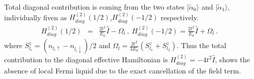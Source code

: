\documentclass[reprint,prb,superscriptaddress]{revtex4-1}
\begin{document}
Total diagonal contribution is coming from the two states $|\tilde{\alpha}_0\rangle$ and $|\tilde{\alpha}_1\rangle$, individually fiven as $H^{(2)}_{diag} (1/2)$,$H^{(2)}_{diag} (-1/2)$ respectively.
\begin{eqnarray}
H^{(2)}_{diag} (1/2) &=& \frac{2t^2}{E_0} \hat{I} - \Omega_l~,~ H^{(2)}_{diag} (-1/2) = \frac{2t^2}{E_0} \hat{I} + \Omega_l ~.~~~~
\end{eqnarray}
where $S_{l_i}^z=(n_{l_i\uparrow}-n_{l_i\downarrow})/2$ and $\Omega_l=\frac{2t^2}{3E_0} ( S_{l_1}^z + S_{l_2}^z)$.  Thus the total contribution to the diagonal effective Hamiltonian is $H^{(2)}_{diag} = -4t^2 \hat{I}$, shows the absence of local Fermi liquid due to the exact cancellation of the field term.
\end{document}
